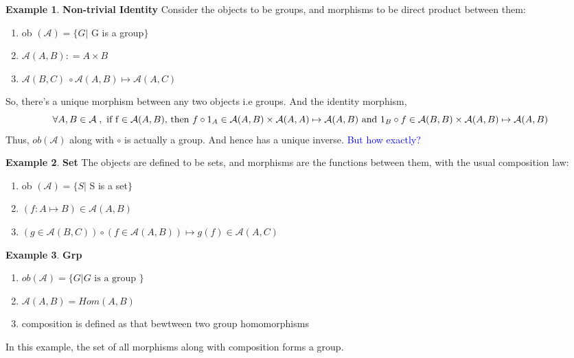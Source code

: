 \documentclass{article}
\theoremstyle{definition}
\newtheorem{example}{Example}[section]
\theoremstyle{definition}
\begin{document}
\begin{example} {\textbf{Non-trivial Identity \;}}%
Consider the objects to be groups, and morphisms to be direct product between them:
\begin{enumerate}[label=\roman*]%
	\item ob $ (\mathcal{A}) = \{ G | $  G is a group$ \} $
	\item $  \mathcal{A}(A,B) : = A \times B $
	\item  $ \mathcal{A}(B,C) \ \circ \mathcal{A}(A,B) \mapsto \mathcal{A}(A,C) $
\end{enumerate}
So, there's a unique morphism between any two objects i.e groups. And the identity morphism,
\[ \forall A,B  \in \mathbb{\mathcal{A} }\;, \text{ if f $ \in \mathcal{A}(A,B)$, then }  f \circ 1_A \in \mathcal{A}(A,B) \times \mathcal{A}(A,A) \mapsto \mathcal{A}(A,B) \text{ and } 1_B \circ f \in \mathcal{A}(B,B) \times \mathcal{A}(A,B) \mapsto \mathcal{A}(A,B) \]
Thus, $ ob(\mathcal{A} ) $ along with $ \circ  $ is actually a group. And hence has a unique inverse.
\textcolor{blue} {But how exactly?}
\end{example}
\begin{example}{\textbf{Set}} %
	The objects are defined to be sets, and morphisms are the functions between them, with the usual composition law:
	\begin{enumerate}[label=\roman*] %
	\item ob $ (\mathcal{A}) = \{ S | $  S is a set$ \} $
	\item $  (f:A \mapsto B )\in \mathcal{A}(A,B)$
	\item  $ (g \in \mathcal{A}(B,C))  \circ (f \in \mathcal{A}(A,B)) \mapsto  g(f) \in \mathcal{A}(A,C) $
	\end{enumerate}
\end{example}
\begin{example}{\textbf{Grp}} %
\begin{enumerate}[label=\roman*]
	\item $  ob(\mathcal{A} ) = \{G| G \text{ is a group } \}  $
	\item $ \mathcal{A} (A,B)= Hom(A,B) $
	\item  composition is defined as that bewtween two group homomorphisms
\end{enumerate}
In this example, the set of all morphisms along with composition forms a group.
\end{example}
\end{document}
